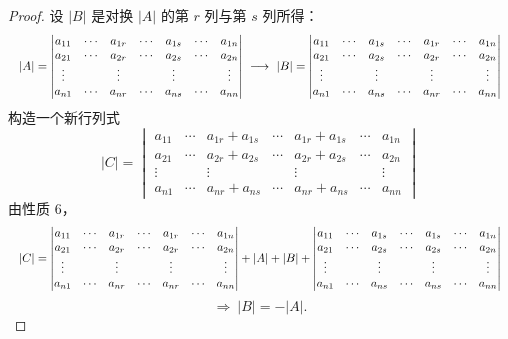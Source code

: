 \begin{proof}
设 $|B|$ 是对换 $|A|$ 的第 $r$ 列与第 $s$ 列所得：
\[
\resizebox{\linewidth}{!}{$\displaystyle
|A|=\begin{vmatrix}
a_{11} & \cdots & a_{1r} & \cdots & a_{1s} & \cdots & a_{1n}\\
a_{21} & \cdots & a_{2r} & \cdots & a_{2s} & \cdots & a_{2n}\\
\vdots & & \vdots & & \vdots & & \vdots\\
a_{n1} & \cdots & a_{nr} & \cdots & a_{ns} & \cdots & a_{nn}
\end{vmatrix}
\ \longrightarrow\
|B|=\begin{vmatrix}
a_{11} & \cdots & a_{1s} & \cdots & a_{1r} & \cdots & a_{1n}\\
a_{21} & \cdots & a_{2s} & \cdots & a_{2r} & \cdots & a_{2n}\\
\vdots & & \vdots & & \vdots & & \vdots\\
a_{n1} & \cdots & a_{ns} & \cdots & a_{nr} & \cdots & a_{nn}
\end{vmatrix}$}
\]
构造一个新行列式
\[
|C|=\begin{vmatrix}
a_{11} & \cdots & a_{1r}+a_{1s} & \cdots & a_{1r}+a_{1s} & \cdots & a_{1n}\\
a_{21} & \cdots & a_{2r}+a_{2s} & \cdots & a_{2r}+a_{2s} & \cdots & a_{2n}\\
\vdots & & \vdots & & \vdots & & \vdots\\
a_{n1} & \cdots & a_{nr}+a_{ns} & \cdots & a_{nr}+a_{ns} & \cdots & a_{nn}
\end{vmatrix}
\]
由性质 6，
\[
\resizebox{\linewidth}{!}{$\displaystyle
|C|=
\begin{vmatrix}
a_{11} & \cdots & a_{1r} & \cdots & a_{1r} & \cdots & a_{1n}\\
a_{21} & \cdots & a_{2r} & \cdots & a_{2r} & \cdots & a_{2n}\\
\vdots & & \vdots & & \vdots & & \vdots\\
a_{n1} & \cdots & a_{nr} & \cdots & a_{nr} & \cdots & a_{nn}
\end{vmatrix}
+|A|+|B|+
\begin{vmatrix}
a_{11} & \cdots & a_{1s} & \cdots & a_{1s} & \cdots & a_{1n}\\
a_{21} & \cdots & a_{2s} & \cdots & a_{2s} & \cdots & a_{2n}\\
\vdots & & \vdots & & \vdots & & \vdots\\
a_{n1} & \cdots & a_{ns} & \cdots & a_{ns} & \cdots & a_{nn}
\end{vmatrix}$}
\]
\[
\Rightarrow\ |B|=-|A|.
\]
\end{proof}


